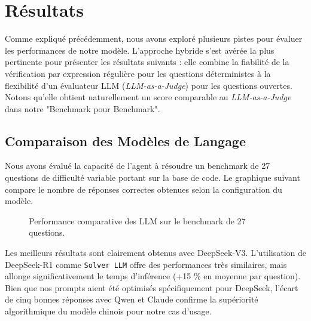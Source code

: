 \section{Résultats}

Comme expliqué précédemment, nous avons exploré plusieurs pistes pour évaluer les performances de notre modèle. L'approche hybride s'est avérée la plus pertinente pour présenter les résultats suivants : elle combine la fiabilité de la vérification par expression régulière pour les questions déterministes à la flexibilité d'un évaluateur LLM (\textit{LLM-as-a-Judge}) pour les questions ouvertes. Notons qu'elle obtient naturellement un score comparable au \textit{LLM-as-a-Judge} dans notre "Benchmark pour Benchmark".

\subsection{Comparaison des Modèles de Langage}

Nous avons évalué la capacité de l'agent à résoudre un benchmark de 27 questions de difficulté variable portant sur la base de code. Le graphique suivant compare le nombre de réponses correctes obtenues selon la configuration du modèle.

\begin{figure}[H]
    \centering
    \caption{Performance comparative des LLM sur le benchmark de 27 questions.}
    \label{fig:performance_modeles}
\end{figure}

Les meilleurs résultats sont clairement obtenus avec DeepSeek-V3. L'utilisation de DeepSeek-R1 comme \texttt{Solver LLM} offre des performances très similaires, mais allonge significativement le temps d'inférence (+15 \% en moyenne par question). Bien que nos prompts aient été optimisés spécifiquement pour DeepSeek, l'écart de cinq bonnes réponses avec Qwen et Claude confirme la supériorité algorithmique du modèle chinois pour notre cas d'usage.


